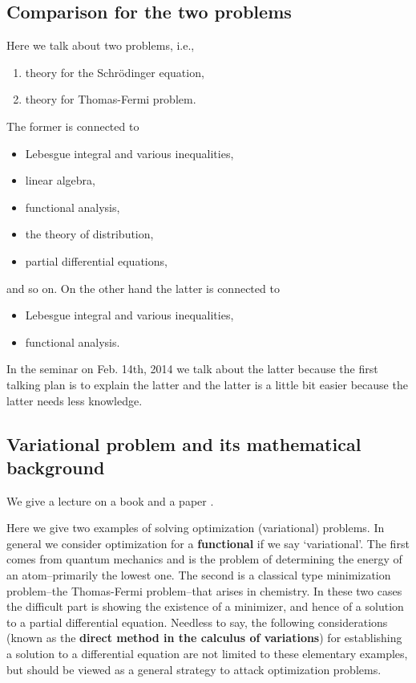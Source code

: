 \documentclass[openany, a4paper, oneside]{jsbook}
\begin{document}
\subsection{Comparison for the two problems}

Here we talk about two problems, i.e.,
\begin{enumerate}
\item theory for the Schr\"odinger equation,
\item theory for Thomas-Fermi problem.
\end{enumerate}
The former is connected to
\begin{itemize}
\item Lebesgue integral and various inequalities,
\item linear algebra,
\item functional analysis,
\item the theory of distribution,
\item partial differential equations,
\end{itemize}
and so on.
On the other hand the latter is connected to
\begin{itemize}
\item Lebesgue integral and various inequalities,
\item functional analysis.
\end{itemize}
In the seminar on Feb. 14th, 2014  we talk about the latter because
the first talking plan is to explain the latter and the latter is a little bit easier
because the latter needs less knowledge.
\subsection{Variational problem and its mathematical background}

We give a lecture on a book \cite{LiebLoss1} and a paper \cite{LiebSimon1}.

Here we give two examples of solving optimization (variational) problems.
In general we consider optimization for a \textbf{functional} if we say `variational'.
The first comes from quantum mechanics and is the problem of determining the energy of an atom--primarily the lowest one.
The second is a classical type minimization problem--the Thomas-Fermi problem--that arises in chemistry.
In these two cases the difficult part is showing the existence of a minimizer, and hence of a solution
to a partial differential equation.
Needless to say, the following considerations (known as the \textbf{direct method in the calculus of variations})
for establishing a solution to a differential equation are not limited to these elementary examples,
but should be viewed as a general strategy to attack optimization problems.
\end{document}
